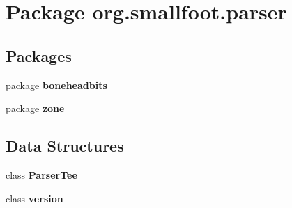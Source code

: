 \section{Package org.\-smallfoot.\-parser}
\label{namespaceorg_1_1smallfoot_1_1parser}
\subsection*{Packages}
\begin{DoxyCompactItemize}
\item 
package {\bf boneheadbits}
\item 
package {\bf zone}
\end{DoxyCompactItemize}
\subsection*{Data Structures}
\begin{DoxyCompactItemize}
\item 
class {\bf Parser\-Tee}
\item 
class {\bf version}
\end{DoxyCompactItemize}
